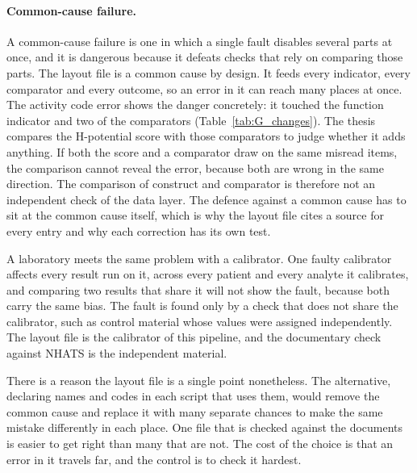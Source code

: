 \paragraph{Common-cause failure.} A common-cause failure is one in which a
single fault disables several parts at once, and it is dangerous because it
defeats checks that rely on comparing those parts. The layout file is a
common cause by design. It feeds every indicator, every comparator and every
outcome, so an error in it can reach many places at once. The activity code
error shows the danger concretely: it touched the function indicator and two
of the comparators (Table~\ref{tab:G_changes}). The thesis compares the
H-potential score with those comparators to judge whether it adds anything.
If both the score and a comparator draw on the same misread items, the
comparison cannot reveal the error, because both are wrong in the same
direction. The comparison of construct and comparator is therefore not an
independent check of the data layer. The defence against a common cause has
to sit at the common cause itself, which is why the layout file cites a source
for every entry and why each correction has its own test.

A laboratory meets the same problem with a calibrator. One faulty calibrator
affects every result run on it, across every patient and every analyte it
calibrates, and comparing two results that share it will not show the fault,
because both carry the same bias. The fault is found only by a check that does
not share the calibrator, such as control material whose values were assigned
independently. The layout file is the calibrator of this pipeline, and the
documentary check against NHATS is the independent material.

There is a reason the layout file is a single point nonetheless. The
alternative, declaring names and codes in each script that uses them, would
remove the common cause and replace it with many separate chances to make the
same mistake differently in each place. One file that is checked against the
documents is easier to get right than many that are not. The cost of the
choice is that an error in it travels far, and the control is to check it
hardest.

